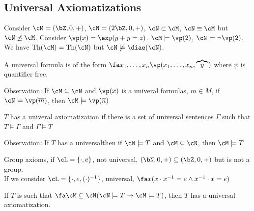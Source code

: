 \subsection{Universal Axiomatizations} 

\begin{example}
    Consider $\cM = (\bZ, 0 , +)$, $\cN = (2\bZ, 0, +)$, $\cN \subset \cM$, $\cN \equiv \cM$ but $\cN \not\preceq \cM$. Consider $\vp(x) = \ex y (y+ y = z)$. $\cM \models \vp(2)$, $\cN \models \neg \vp(2)$. \\
    We have $\text{Th}(\cM) = \text{Th}(\cN)$ but $\cN \not\models \diae(\cN)$. 
\end{example}

\begin{definition}
    A universal formula is of the form $\fa x_1, \ldots, x_n \vp(x_1, \ldots, x_n, \overbrace{y})$ where $\psi$ is quantifier free. 
\end{definition}

\noindent
Observation: If $\cM \subseteq \cN$ and $\vp(\overline{x})$ is a univeral formulas, $\overline{m} \in M$, if $\cN \models \vp(\overline{m})$, then $\cM \models \vp(\overline{n})$ 

\begin{definition}
    $T$ has a univeral axiomatization if there is a set of universal sentences $\Gamma$ such that $T \models \Gamma$ and $\Gamma \models T$ 
\end{definition}

\noindent
Observation: If $T$ has a universalthen if $\cN \models T$ and $\cM \subseteq \cN$, then $\cM \models T$ 

\begin{example}
    Group axioms, if $\cL = \{\cdot, e\}$, not universal, $(\bN, 0, +) \subseteq (\bZ, 0, +)$ but is not a group. \\
    If we consider $\cL = \{\cdot, e, (\cdot)^{-1}\}$, universal, $\fa x (x \cdot x^{-1} = e \wedge x^{-1} \cdot x = e)$ 
\end{example}

\begin{theorem}
    If $T$ is such that $\fa \cM \subseteq \cN (\cN \models T \to \cM \models T)$, then $T$ has a universal axiomatization. 
\end{theorem}

